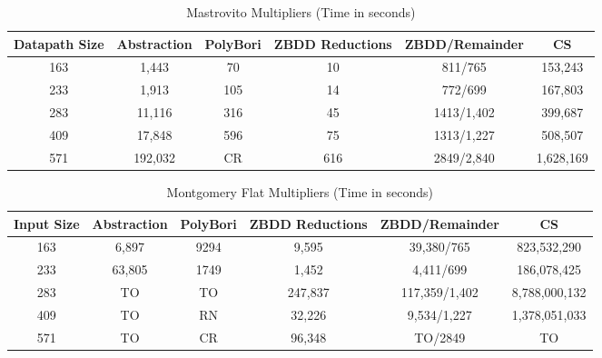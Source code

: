 \documentclass{article}
\begin{document}
\begin{table}
\centering
\caption{Mastrovito Multipliers (Time in seconds)}
\begin{tabular}{| c | c | c | c | c | c |} \hline
\textbf{Datapath Size} & \textbf{Abstraction} & \textbf{PolyBori} &\textbf{ZBDD Reductions} & \textbf{ZBDD/Remainder} & \textbf{CS}\\ \hline
163 & 1,443 &70& 10 & 811/765 & 153,243\\ \hline 
233 & 1,913 &105& 14 & 772/699& 167,803\\ \hline
283 & 11,116 &316& 45 & 1413/1,402&399,687\\ \hline
409 & 17,848 &596& 75 & 1313/1,227&508,507\\ \hline
571 & 192,032 &CR& 616 & 2849/2,840&1,628,169\\ \hline 


\end{tabular}
\end{table}



\begin{table}
\centering
\caption{Montgomery Flat Multipliers (Time in seconds)}
\begin{tabular}{| c | c | c | c | c | c |} \hline
\textbf{Input Size} & \textbf{Abstraction} & \textbf{PolyBori} &\textbf{ZBDD Reductions} & \textbf{ZBDD/Remainder} & \textbf{CS}\\ \hline
163 & 6,897 &9294&9,595 & 39,380/765 & 823,532,290\\ \hline 
233 & 63,805 &1749&1,452&4,411/699 & 186,078,425\\ \hline
283 & TO &TO& 247,837 &117,359/1,402 &8,788,000,132\\ \hline
409 & TO & RN& 32,226 &9,534/1,227 &1,378,051,033\\ \hline
571 & TO &CR& 96,348& TO/2849 & TO\\ \hline 

\end{tabular}
\end{table}
\end{document}
